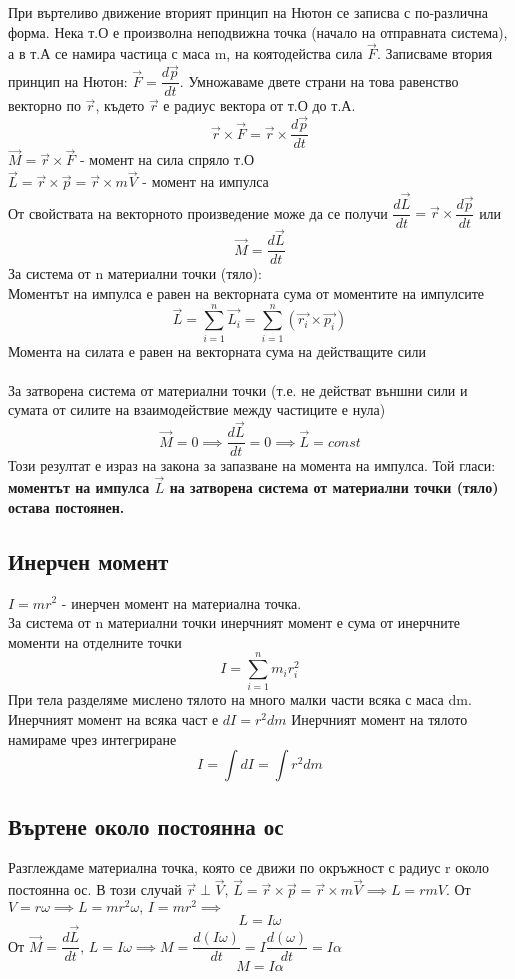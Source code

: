 \documentclass[fleqn]{article}
\begin{document}
При въртеливо движение вторият принцип на Нютон се записва с по-различна форма. Нека т.О е произволна неподвижна точка (начало на отправната система), а в т.А се намира частица с маса m, на коятодейства сила $\vec{F}$. Записваме втория принцип на Нютон: $\vec{F} = \dfrac{d \vec{p}}{dt}$. Умножаваме двете страни на това равенство векторно по $\vec{r}$, където $\vec{r}$ е радиус вектора от т.О до т.А. 
$$\vec{r} \times \vec{F} = \vec{r} \times \dfrac{d \vec{p}}{dt} $$
$\vec{M} = \vec{r} \times \vec{F} $ - момент на сила спряло т.О \\
$\vec{L} = \vec{r} \times \vec{p} = \vec{r} \times m\vec{V}$  - момент на импулса \\
От свойствата на векторното произведение може да се получи $\dfrac{d \vec{L}}{dt} =  \vec{r} \times \dfrac{d \vec{p}}{dt}$ или
$$\vec{M} = \dfrac{d \vec{L}}{dt}$$
За система от n материални точки (тяло): \\
Моментът на импулса е равен на векторната сума от моментите на импулсите 
$$\vec{L} = \sum_{i=1} ^n \vec{L_i} = \sum_{i=1} ^n \left( \vec{r_i} \times \vec{p_i} \right)  $$
Момента на силата е равен на векторната сума на действащите сили \\
\\
За затворена система от материални точки (т.е. не действат външни сили и сумата от силите на взаимодействие между частиците е нула) 
$$\vec{M} = 0 \implies \dfrac{d \vec{L}}{dt} = 0 \implies \vec{L} = const$$
Този резултат е израз на закона за запазване на момента на импулса. Той гласи: \textbf{моментът на импулса $\vec{L}$ на затворена система от материални точки (тяло) остава постоянен.}

\subsection{Инерчен момент}
$I = mr^2$ - инерчен момент на материална точка. \\
За система от n материални точки инерчният момент е сума от инерчните моменти на отделните точки 
$$I = \sum_{i=1} ^n m_i r_i^2$$
При тела разделяме мислено тялото на много малки части всяка с маса dm. Инерчният момент на всяка част е $dI = r^2dm$ Инерчният момент на тялото намираме чрез интегриране
$$I = \int dI = \int r^2dm $$

\subsection{Въртене около постоянна ос}
Разглеждаме материална точка, която се движи по окръжност с радиус r около постоянна ос. В този случай  $\vec{r} \perp \vec{V}, \, \vec{L} = \vec{r} \times \vec{p} = \vec{r} \times m\vec{V} \implies L = rmV $. От $V = r \omega \implies L =mr^2  \omega, \, I = mr^2 \implies $ 
$$L = I\omega$$
От $\vec{M} = \dfrac{d \vec{L}}{dt},\, L = I\omega \implies  M = \dfrac{d(I\omega)}{dt} = I \dfrac{d(\omega)}{dt} = I\alpha$
$$M = I\alpha $$
\end{document}
